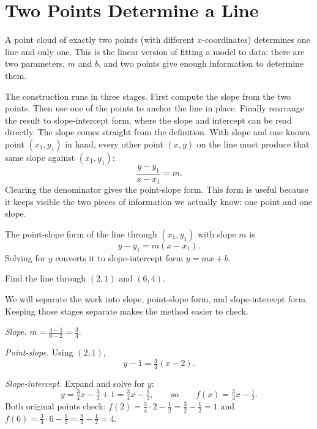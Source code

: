 \documentclass[12pt]{book}
\begin{document}
\section{Two Points Determine a Line}

A point cloud of exactly two points (with different $x$-coordinates) determines one
line and only one. This is the linear version of fitting a model to data: there are
two parameters, $m$ and $b$, and two points give enough information to determine them.

The construction runs in three stages. First compute the slope from the two points.
Then use one of the points to anchor the line in place. Finally rearrange the result
to slope-intercept form, where the slope and intercept can be read directly.
The slope comes straight from the definition. With slope and one known point
$(x_1,y_1)$ in hand, every other point $(x,y)$ on the line must produce that same
slope against $(x_1,y_1)$:
\[
\frac{y-y_1}{x-x_1}=m.
\]
Clearing the denominator gives the point-slope form. This form is useful because it
keeps visible the two pieces of information we actually know: one point and one
slope.
\begin{keyidea}
The point-slope form of the line through $(x_1,y_1)$ with slope $m$ is
\[
y-y_1=m(x-x_1).
\]
Solving for $y$ converts it to slope-intercept form $y=mx+b$.
\end{keyidea}

\begin{example}[from two points to $f(x)=mx+b$]
Find the line through $(2,1)$ and $(6,4)$.

We will separate the work into slope, point-slope form, and slope-intercept form.
Keeping those stages separate makes the method easier to check.

\emph{Slope.} $\displaystyle m=\frac{4-1}{6-2}=\frac{3}{4}.$

\emph{Point-slope.} Using $(2,1)$,
\[
y-1=\tfrac34(x-2).
\]

\emph{Slope-intercept.} Expand and solve for $y$:
\[
y=\tfrac34x-\tfrac32+1=\tfrac34x-\tfrac12,
\qquad\text{so}\qquad f(x)=\tfrac34x-\tfrac12.
\]
Both original points check: $f(2)=\tfrac34\cdot2-\tfrac12=\tfrac32-\tfrac12=1$ and
$f(6)=\tfrac34\cdot6-\tfrac12=\tfrac92-\tfrac12=4$.
\end{example}

\begin{center}
\end{center}
\end{document}
